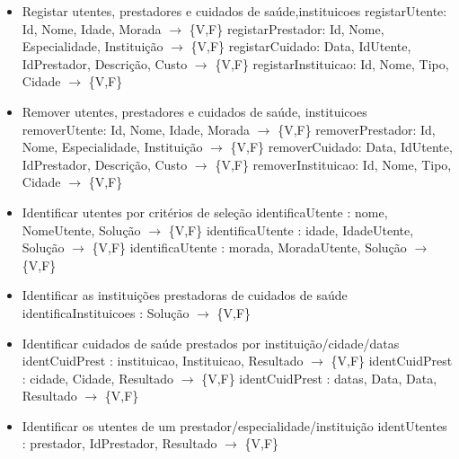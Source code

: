 \documentclass{article}
\begin{document}
\begin{itemize}
	\item Registar utentes, prestadores e cuidados de saúde,instituicoes
    \newline
    registarUtente: Id, Nome, Idade, Morada $\to$ \{V,F\}
	\newline
    registarPrestador: Id, Nome, Especialidade, Instituição $\to$ \{V,F\}
	\newline
    registarCuidado: Data, IdUtente, IdPrestador, Descrição, Custo $\to$ \{V,F\}
	\newline
    registarInstituicao: Id, Nome, Tipo, Cidade $\to$ \{V,F\}
    \item Remover utentes, prestadores e cuidados de saúde, instituicoes
    \newline
    removerUtente: Id, Nome, Idade, Morada $\to$ \{V,F\}
    \newline
    removerPrestador: Id, Nome, Especialidade, Instituição $\to$ \{V,F\}
    \newline
    removerCuidado: Data, IdUtente, IdPrestador, Descrição, Custo $\to$ \{V,F\}
    \newline
    removerInstituicao: Id, Nome, Tipo, Cidade $\to$ \{V,F\}
    \item Identificar utentes por critérios de seleção
    \newline
    identificaUtente : nome, NomeUtente, Solução $\to$ \{V,F\}
    \newline
    identificaUtente : idade, IdadeUtente, Solução $\to$ \{V,F\}
    \newline
    identificaUtente : morada, MoradaUtente, Solução $\to$ \{V,F\}
    \item Identificar as instituições prestadoras de cuidados de saúde
    \newline
    identificaInstituicoes : Solução $\to$ \{V,F\}
    \item Identificar cuidados de saúde prestados por instituição/cidade/datas
    \newline
    identCuidPrest : instituicao, Instituicao, Resultado $\to$ \{V,F\}
    \newline
    identCuidPrest : cidade, Cidade, Resultado $\to$ \{V,F\}
    \newline
    identCuidPrest : datas, Data, Data, Resultado $\to$ \{V,F\}
    \item
    Identificar os utentes de um prestador/especialidade/instituição
    \newline
    identUtentes : prestador, IdPrestador, Resultado $\to$ \{V,F\}

\end{itemize}
\end{document}
